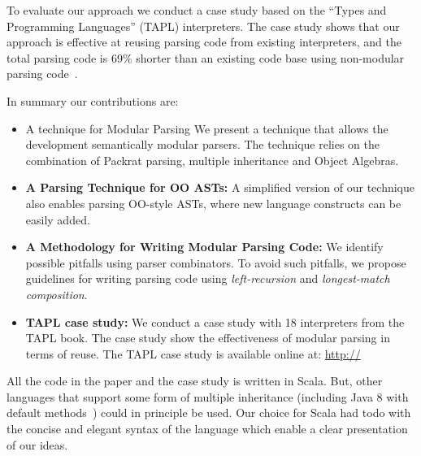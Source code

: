 \begin{comment}
  By analising the \emph{full} grammar it is possible to remove
  backtracking, which would otherwise increase parsing times. Many
  parsing combinator libraries routinely use backtracting elimination
  to achieve performance. However, in a modular setting this technique
  cannot be used, because the full grammar is not known. Thus we have
  to be very conservative at eliminating backtracting. Unfortunatelly,
  this has a severe impact on performance.
\end{comment}

To evaluate our approach we conduct a case study based on the ``Types
and Programming Languages'' (TAPL) interpreters. The case study shows
that our approach is effective at reusing parsing code from existing
interpreters, and the total parsing code is 69\% shorter than an
existing code base using non-modular parsing code~\cite{}.

In summary our contributions are:

\begin{itemize}

\item {A technique for Modular Parsing} We present a technique 
that allows the development semantically modular parsers.
The technique relies on the combination of Packrat parsing, multiple inheritance 
  and Object Algebras.

\item {{\bf A Parsing Technique for OO ASTs:}} A simplified version of
  our technique also enables parsing OO-style ASTs, where new language
  constructs can be easily added. 

\item {{\bf A Methodology for Writing Modular Parsing Code:}} We
  identify possible pitfalls using parser combinators. To avoid such
  pitfalls, we propose guidelines for writing parsing code using 
  \emph{left-recursion} and \emph{longest-match composition}.

\item {{\bf TAPL case study:}} We conduct a case study with 18 interpreters
  from the TAPL book. The case study show the effectiveness of modular 
  parsing in terms of reuse. The TAPL case study is available online
  at:
  \url{http://}

\end{itemize}

All the code in the paper and the case study is written in Scala. But,
other languages that support some form of multiple inheritance
(including Java 8 with default methods~\cite{}) could in principle be
used. Our choice for Scala had todo with the concise and elegant syntax  
of the language which enable a clear presentation of our ideas.